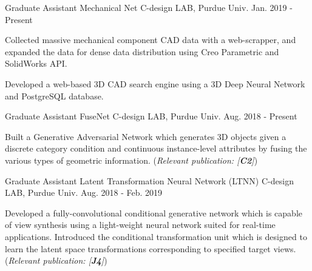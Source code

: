


\begin{cventries}

\cventry
{Graduate Assistant} %
{Mechanical Net} %
{C-design LAB, Purdue Univ.} %
{Jan. 2019 - Present} %
{ %
\begin{cvitems}
\item {Collected massive mechanical component CAD data with a web-scrapper, and expanded the data for dense data distribution using Creo Parametric and SolidWorks API.}
\item {Developed a web-based 3D CAD search engine using a 3D Deep Neural Network and PostgreSQL database.}
\end{cvitems}
}


\cventry
{Graduate Assistant} %
{FuseNet} %
{C-design LAB, Purdue Univ.} %
{Aug. 2018 - Present} %
{ %
\begin{cvitems}
\item {Built a Generative Adversarial Network which generates 3D objects given a discrete category condition and continuous instance-level attributes by fusing the various types of geometric information. (\textit{Relevant publication: [\textbf{C2}]})}
\end{cvitems}
}


\cventry
{Graduate Assistant} %
{Latent Transformation Neural Network (LTNN)} %
{C-design LAB, Purdue Univ.} %
{Aug. 2018 - Feb. 2019} %
{ %
\begin{cvitems}
\item {Developed a fully-convolutional conditional generative network which is capable of view synthesis using a light-weight neural network suited for real-time applications. Introduced the conditional transformation unit which is designed to learn the latent space transformations corresponding to specified target views. (\textit{Relevant publication: [\textbf{J4}]})}
\end{cvitems}
}


\end{cventries}
